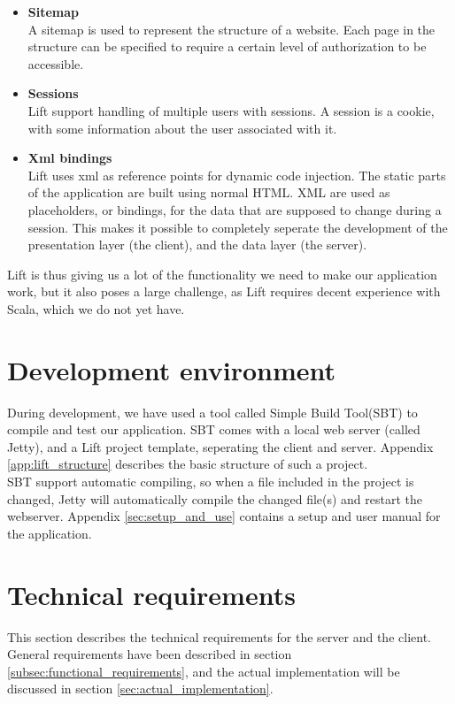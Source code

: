 \begin{itemize}
	\item \textbf{Sitemap}\\
	A sitemap is used to represent the structure of a website. Each page in the structure can be specified to require a certain level of authorization to be accessible. \\
	\item \textbf{Sessions}\\
	Lift support handling of multiple users with sessions. A session is a cookie, with some information about the user associated with it.\\
	\item \textbf{Xml bindings}\\
	Lift uses xml as reference points for dynamic code injection. The static parts of the application are built using normal HTML. XML are used as placeholders, or bindings, for the data that are supposed to change during a session. This makes it possible to completely seperate the development of the presentation layer (the client), and the data layer (the server).
\end{itemize}

Lift is thus giving us a lot of the functionality we need to make our application work, but it also poses a large challenge, as Lift requires decent experience with Scala, which we do not yet have.

\section{Development environment}
\label{sec:development_environment}
During development, we have used a tool called Simple Build Tool(SBT)\cite{sbt} to compile and test our application. SBT comes with a local web server (called Jetty), and a Lift project template, seperating the client and server. Appendix \ref{app:lift_structure} describes the basic structure of such a project.\\
SBT support automatic compiling, so when a file included in the project is changed, Jetty will automatically compile the changed file(s) and restart the webserver. Appendix \ref{sec:setup_and_use} contains a setup and user manual for the application.

\section{Technical requirements}
\label{sec:tech_req}
This section describes the technical requirements for the server and the client. General requirements have been described in section \ref{subsec:functional_requirements}, and the actual implementation will be discussed in section \ref{sec:actual_implementation}.

